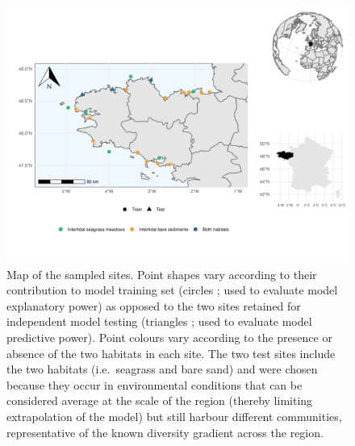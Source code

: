 \begin{figure}
\hypertarget{fig:chapt1supp1}{%
\centering
\includegraphics{03-Chapitre1/figures/supplementary/fig_supp1.png}
\caption{Map of the sampled sites. Point shapes vary according to their
contribution to model training set (circles ; used to evaluate model
explanatory power) as opposed to the two sites retained for independent
model testing (triangles ; used to evaluate model predictive power).
Point colours vary according to the presence or absence of the two
habitats in each site. The two test sites include the two habitats
(i.e.~seagrass and bare sand) and were chosen because they occur in
environmental conditions that can be considered average at the scale of
the region (thereby limiting extrapolation of the model) but still
harbour different communities, representative of the known diversity
gradient across the region.}\label{fig:chapt1supp1}
}
\end{figure}

